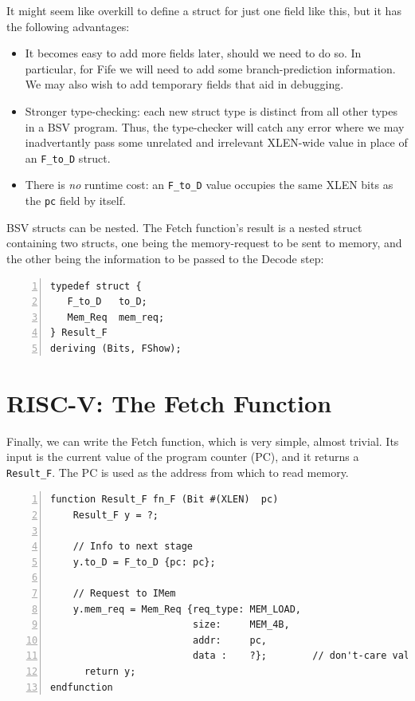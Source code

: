 
It might seem like overkill to define a struct for just one field like
this, but it has the following advantages:

\begin{itemize}

  \item It becomes easy to add more fields later, should we need to do
    so.  In particular, for Fife we will need to add some
    branch-prediction information.  We may also wish to add temporary
    fields that aid in debugging.

  \item Stronger type-checking: each new struct type is distinct from
    all other types in a BSV program.  Thus, the type-checker will
    catch any error where we may inadvertantly pass some unrelated and
    irrelevant XLEN-wide value in place of an \verb|F_to_D| struct.

  \item There is \emph{no} runtime cost: an \verb|F_to_D| value
    occupies the same XLEN bits as the \verb|pc| field by itself.

\end{itemize}


BSV structs can be nested.  The Fetch function's result is a nested
struct containing two structs, one being the memory-request to be sent
to memory, and the other being the information to be passed to the
Decode step:

\begin{Verbatim}[frame=single, numbers=left]
typedef struct {
   F_to_D   to_D;
   Mem_Req  mem_req;
} Result_F
deriving (Bits, FShow);
\end{Verbatim}


\section{RISC-V: The Fetch Function}

\label{Sec_Fetch_function}

Finally, we can write the Fetch function, which is very simple, almost
trivial.  Its input is the current value of the program counter (PC),
and it returns a \verb|Result_F|.  The PC is used as the address from
which to read memory.

\begin{Verbatim}[frame=single, numbers=left]
function Result_F fn_F (Bit #(XLEN)  pc)
    Result_F y = ?;

    // Info to next stage
    y.to_D = F_to_D {pc: pc};

    // Request to IMem
    y.mem_req = Mem_Req {req_type: MEM_LOAD,
                         size:     MEM_4B,
                         addr:     pc,
                         data :    ?};        // don't-care value
      return y;
endfunction
\end{Verbatim}

